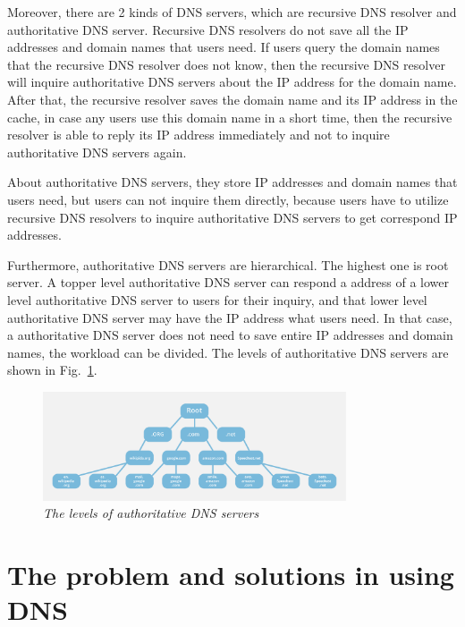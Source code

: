 	Moreover, there are 2 kinds of DNS servers, which are recursive DNS resolver and authoritative DNS server. Recursive DNS resolvers do not save all the IP addresses and domain names that users need. If users query the domain names that the recursive DNS resolver does not know, then the recursive DNS resolver will inquire authoritative DNS servers about the IP address for the domain name. After that, the recursive resolver saves the domain name and its IP address in the cache, in case any users use this domain name in a short time, then the recursive resolver is able to reply its IP address immediately and not to inquire authoritative DNS servers again.
	
	About authoritative DNS servers, they store IP addresses and domain names that users need, but users can not inquire them directly, because users have to utilize recursive DNS resolvers to inquire authoritative DNS servers to get correspond IP addresses.
	
	Furthermore, authoritative DNS servers are hierarchical. The highest one is root server. A topper level authoritative DNS server can respond a address of a lower level authoritative DNS server to users for their inquiry, and that lower level authoritative DNS server may have the IP address what users need. In that case, a authoritative DNS server does not need to save entire IP addresses and domain names, the workload can be divided. The levels of authoritative DNS servers are shown in Fig.~\ref{fig:levels_authoritative_DNS_servers}.
	
	\begin{figure}[h]  
    \centering
    \includegraphics[width=0.8\textwidth]{figure/dns-root-server.png}
    \caption{\em The levels of authoritative DNS servers \cite{dns_root_server_cloudflare}}
    \label{fig:levels_authoritative_DNS_servers}
    \end{figure}
	
	\section{The problem and solutions in using DNS}
	
